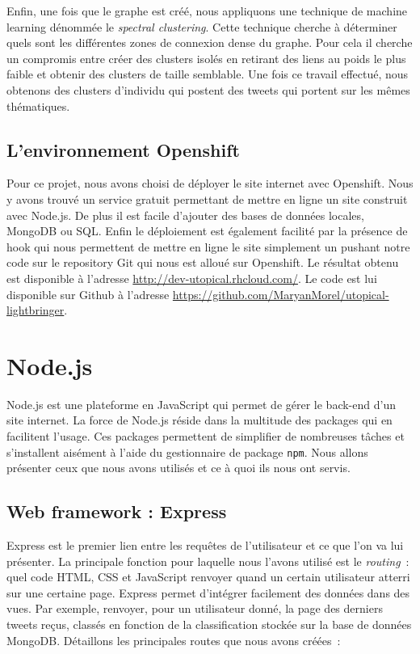 \documentclass[a4paper]{article}
\begin{document}
Enfin, une fois que le graphe est créé, nous appliquons une technique de machine learning dénommée le \emph{spectral clustering}. Cette technique cherche à déterminer quels sont les différentes zones de connexion dense du graphe. Pour cela il cherche un compromis entre créer des clusters isolés en retirant des liens au poids le plus faible et obtenir des clusters de taille semblable. Une fois ce travail effectué, nous obtenons des clusters d'individu qui postent des tweets qui portent sur les mêmes thématiques.


\subsection{L'environnement Openshift}
Pour ce projet, nous avons choisi de déployer le site internet avec Openshift. Nous y avons trouvé un service gratuit permettant de mettre en ligne un site construit avec Node.js. De plus il est facile d'ajouter des bases de données locales, MongoDB ou SQL. Enfin le déploiement est également facilité par la présence de hook qui nous permettent de mettre en ligne le site simplement un pushant notre code sur le repository Git qui nous est alloué sur Openshift.
Le résultat obtenu est disponible à l'adresse \url{http://dev-utopical.rhcloud.com/}. Le code est lui disponible sur Github à l'adresse \url{https://github.com/MaryanMorel/utopical-lightbringer}.

\section{Node.js}

Node.js est une plateforme en JavaScript qui permet de gérer le back-end d'un site internet. La force de Node.js réside dans la multitude des packages qui en facilitent l'usage. Ces packages permettent de simplifier de nombreuses tâches et s'installent aisément à l'aide du gestionnaire de package \texttt{npm}. Nous allons présenter ceux que nous avons utilisés et ce à quoi ils nous ont servis.


\subsection{Web framework : Express}
Express est le premier lien entre les requêtes de l'utilisateur et ce que l'on va lui présenter. La principale fonction pour laquelle nous l'avons utilisé est le \emph{routing}~: quel code HTML, CSS et JavaScript renvoyer quand un certain utilisateur atterri sur une certaine page. Express permet d'intégrer facilement des données dans des vues. Par exemple, renvoyer, pour un utilisateur donné, la page
des derniers tweets reçus, classés en fonction de la classification stockée sur la base de données MongoDB. Détaillons les principales routes que nous avons créées~:
\end{document}
